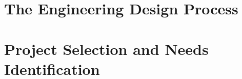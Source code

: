 \documentclass[letterpaper, 10pt]{memoir}
\begin{document}
\showanswers
\chapter{The Engineering Design Process}


\chapter{Project Selection and Needs Identification}




\begin{comment}










\end{comment}
\end{document}
